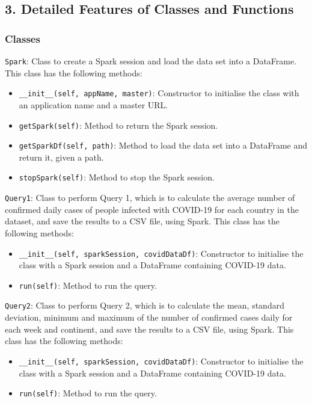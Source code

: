 \documentclass[12pt,oneside]{book} %
\begin{document}
\subsection*{3. Detailed Features of Classes and Functions}
\subsubsection*{Classes}
\begin{description}
    \item \texttt{Spark}:
          Class to create a Spark session and load the data set into a DataFrame. This class has the following methods:
          \begin{itemize}
              \item \texttt{\_\_init\_\_(self, appName, master)}: Constructor to initialise the class with an application name and a master URL.
              \item \texttt{getSpark(self)}: Method to return the Spark session.
              \item \texttt{getSparkDf(self, path)}: Method to load the data set into a DataFrame and return it, given a path.
              \item \texttt{stopSpark(self)}: Method to stop the Spark session.
          \end{itemize}

    \item \texttt{Query1}:
          Class to perform Query 1, which is to calculate the average number of confirmed daily cases of people infected with COVID-19 for each country in the dataset, and save the results to a CSV file, using Spark. This class has the following methods:
          \begin{itemize}
              \item \texttt{\_\_init\_\_(self, sparkSession, covidDataDf)}: Constructor to initialise the class with a Spark session and a DataFrame containing COVID-19 data.
              \item \texttt{run(self)}: Method to run the query.
          \end{itemize}

    \item \texttt{Query2}:
          Class to perform Query 2, which is to calculate the mean, standard deviation, minimum and maximum of the number of confirmed cases daily for each week and continent, and save the results to a CSV file, using Spark. This class has the following methods:
          \begin{itemize}
              \item \texttt{\_\_init\_\_(self, sparkSession, covidDataDf)}: Constructor to initialise the class with a Spark session and a DataFrame containing COVID-19 data.
              \item \texttt{run(self)}: Method to run the query.
          \end{itemize}


\end{description}
\end{document}
